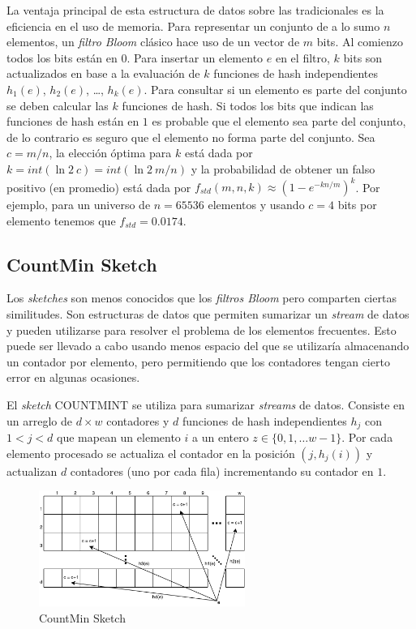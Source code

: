 \documentclass[a4paper,10pt, oneside]{article}
\begin{document}
La ventaja principal de esta estructura de datos sobre las tradicionales es la eficiencia en el uso de memoria. Para representar un conjunto de a lo sumo $n$ elementos, un \textit{filtro Bloom} clásico hace uso de un vector de $m$ bits. Al comienzo todos los bits están en $0$. Para insertar un elemento $e$ en el filtro, $k$ bits son actualizados en base a la evaluación de $k$ funciones de hash independientes $h_1(e)$, $h_2(e)$, \dots, $h_k(e)$. Para consultar si un elemento es parte del conjunto se deben calcular las $k$ funciones de hash. Si todos los bits que indican las funciones de hash están en $1$ es probable que el elemento sea parte del conjunto, de lo contrario es seguro que el elemento no forma parte del conjunto. Sea $c=m/n$, la elección óptima para $k$ está dada por $k=int(\ln 2 \ c) = int(\ln 2 \ m/n)$ y la probabilidad de obtener un falso positivo (en promedio) está dada por $f_{std} (m,n,k) \approx (1-e^{-kn/m})^k$\cite{Bloom:1970:STH:362686.362692}. Por ejemplo, para un universo de $n=65536$ elementos y usando $c=4$ bits por elemento tenemos que $f_{std}=0.0174$.


\subsection{CountMin Sketch}

Los \textit{sketches} son menos conocidos que los \textit{filtros Bloom} pero comparten ciertas similitudes. Son estructuras de datos que permiten sumarizar un \textit{stream} de datos y pueden utilizarse para resolver el problema de los elementos frecuentes. Esto puede ser llevado a cabo usando menos espacio del que se utilizaría almacenando un contador por elemento, pero permitiendo que los contadores tengan cierto error en algunas ocasiones.

El \textit{sketch} COUNTMINT\cite{Cormode:2005:IDS:1073713.1073718} se utiliza para sumarizar \textit{streams} de datos. Consiste en un arreglo de $d \times w$ contadores y $d$ funciones de hash independientes $h_j$ con $1<j<d$ que mapean un elemento $i$ a un entero $z \in \{0, 1, \dots w-1\}$. Por cada elemento procesado se actualiza el contador en la posición $(j,h_j(i))$ y actualizan $d$ contadores (uno por cada fila) incrementando su contador en $1$.

\begin{figure}[htbp]
	\centering
	\includegraphics[width=0.6\textwidth]{graph/cmSketch.pdf}
	\caption{CountMin Sketch}
	\label{fig:cmSketch}
\end{figure}
\end{document}
